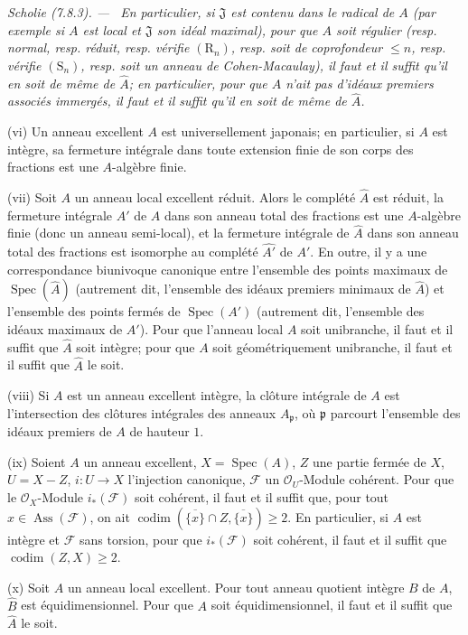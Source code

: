\documentclass[10pt,oneside]{book}
\newcommand{\oldpage}[2][]{%
  \setcounter{footnote}{0}%
  \marginpar{\scriptsize\textbf{#1}~|~#2}\ignorespaces}
\newenvironment{scholium}[1][]{%
  \par\medskip\noindent\itshape Scholie (#1). ---\ }{\par}
\begin{document}
\begin{scholium}[7.8.3]
En particulier, si $\mathfrak J$ est contenu dans le radical de $A$ (par
exemple si $A$ est local et $\mathfrak J$ son idéal maximal), pour que $A$ soit
régulier (resp. normal, resp. réduit, resp. vérifie $(\mathrm R_n)$, resp. soit
de coprofondeur $\leq n$, resp. vérifie $(\mathrm S_n)$, resp. soit un anneau
de Cohen-Macaulay), il faut et il suffit qu'il en soit de même de $\widehat A$;
en particulier, pour que $A$ n'ait pas d'idéaux premiers associés immergés, il
faut et il suffit qu'il en soit de même de $\widehat A$.

(vi) Un anneau excellent $A$ est universellement japonais; en particulier, si
$A$ est intègre, sa fermeture intégrale dans toute extension finie de son corps
des fractions est une $A$-algèbre finie.

(vii) Soit $A$ un anneau local excellent réduit. Alors le complété $\widehat A$
est réduit, la fermeture intégrale $A'$ de $A$ dans son anneau total des
fractions est une $A$-algèbre finie (donc un anneau semi-local), et la fermeture
intégrale de $\widehat A$ dans son anneau total des fractions est isomorphe au
complété $\widehat {A'}$ de $A'$. En outre, il y a une correspondance biunivoque
canonique entre l'ensemble des points maximaux de
$\operatorname{Spec}(\widehat A)$ (autrement dit, l'ensemble des idéaux premiers
minimaux de $\widehat A$) et l'ensemble des points fermés de
$\operatorname{Spec}(A')$ (autrement dit, l'ensemble des idéaux maximaux de
$A'$). Pour que l'anneau local $A$ soit unibranche, il faut et il suffit que
$\widehat A$ soit intègre; pour que $A$ soit géométriquement unibranche, il faut
et il suffit que $\widehat A$ le soit.

(viii) Si $A$ est un anneau excellent intègre, la clôture intégrale de $A$ est
l'intersection des clôtures intégrales des anneaux $A_{\mathfrak p}$, où
$\mathfrak p$ parcourt l'ensemble des idéaux premiers de $A$ de hauteur $1$.

(ix) Soient $A$ un anneau excellent, $X=\operatorname{Spec}(A)$, $Z$ une partie
fermée de $X$, $U=X-Z$, $i:U\to X$ l'injection canonique, $\mathcal F$ un
$\mathcal O_U$-Module cohérent. Pour que le $\mathcal O_X$-Module
$i_*(\mathcal F)$ soit cohérent, il faut et il suffit que, pour tout
$x\in\operatorname{Ass}(\mathcal F)$, on ait
$\operatorname{codim}(\overline{\{x\}}\cap Z,\overline{\{x\}})\geq2$. En
particulier, si $A$ est intègre et $\mathcal F$ sans torsion, pour que
$i_*(\mathcal F)$ soit cohérent, il faut et il suffit que
$\operatorname{codim}(Z,X)\geq2$.

\oldpage[IV-2]{216}

(x) Soit $A$ un anneau local excellent. Pour tout anneau quotient intègre $B$
de $A$, $\widehat B$ est équidimensionnel. Pour que $A$ soit équidimensionnel,
il faut et il suffit que $\widehat A$ le soit.
\end{scholium}
\end{document}

